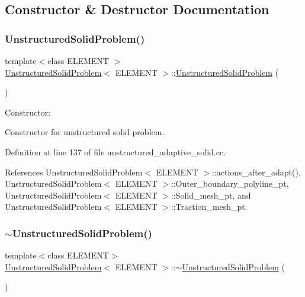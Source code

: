 \subsection{Constructor \& Destructor Documentation}
\mbox{\label{classUnstructuredSolidProblem_a18ce02b6e4bbc86403c9e1b32c095772}} 
\subsubsection{\texorpdfstring{Unstructured\+Solid\+Problem()}{UnstructuredSolidProblem()}}
{\footnotesize\ttfamily template$<$class E\+L\+E\+M\+E\+NT $>$ \\
\hyperlink{classUnstructuredSolidProblem}{Unstructured\+Solid\+Problem}$<$ E\+L\+E\+M\+E\+NT $>$\+::\hyperlink{classUnstructuredSolidProblem}{Unstructured\+Solid\+Problem} (\begin{DoxyParamCaption}{ }\end{DoxyParamCaption})}



Constructor\+: 

Constructor for unstructured solid problem. 

Definition at line 137 of file unstructured\+\_\+adaptive\+\_\+solid.\+cc.



References Unstructured\+Solid\+Problem$<$ E\+L\+E\+M\+E\+N\+T $>$\+::actions\+\_\+after\+\_\+adapt(), Unstructured\+Solid\+Problem$<$ E\+L\+E\+M\+E\+N\+T $>$\+::\+Outer\+\_\+boundary\+\_\+polyline\+\_\+pt, Unstructured\+Solid\+Problem$<$ E\+L\+E\+M\+E\+N\+T $>$\+::\+Solid\+\_\+mesh\+\_\+pt, and Unstructured\+Solid\+Problem$<$ E\+L\+E\+M\+E\+N\+T $>$\+::\+Traction\+\_\+mesh\+\_\+pt.

\mbox{\label{classUnstructuredSolidProblem_a25fe105d949498bf8f7c15aff96a7d00}} 
\subsubsection{\texorpdfstring{$\sim$\+Unstructured\+Solid\+Problem()}{~UnstructuredSolidProblem()}}
{\footnotesize\ttfamily template$<$class E\+L\+E\+M\+E\+NT$>$ \\
\hyperlink{classUnstructuredSolidProblem}{Unstructured\+Solid\+Problem}$<$ E\+L\+E\+M\+E\+NT $>$\+::$\sim$\hyperlink{classUnstructuredSolidProblem}{Unstructured\+Solid\+Problem} (\begin{DoxyParamCaption}{ }\end{DoxyParamCaption})\hspace{0.3cm}{\ttfamily [inline]}}



